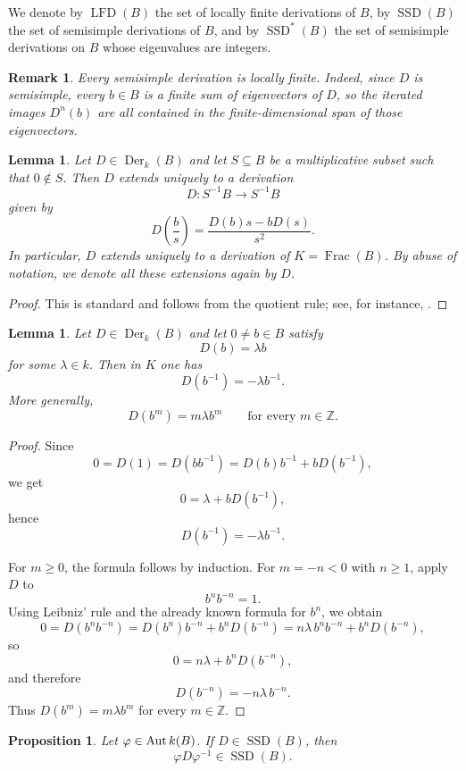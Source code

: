 \documentclass[12pt]{amsart}
\newtheorem{proposition}[theorem]{Proposition}
\newtheorem{lemma}[theorem]{Lemma}
\newtheorem{remark}[theorem]{Remark}
\newcommand{\Z}{\mathbb Z}
\newcommand{\Der}{\operatorname{Der}}
\newcommand{\Aut}[1]{\operatorname{Aut}}
\newcommand{\Frac}{\operatorname{Frac}}
\newcommand{\SSD}{\operatorname{SSD}}
\newcommand{\LFD}{\operatorname{LFD}}
\begin{document}
We denote by $\LFD(B)$ the set of locally finite derivations of $B$, by $\SSD(B)$ the set of semisimple derivations of $B$, and by $\SSD^{*}(B)$ the set of semisimple derivations on $B$ whose eigenvalues are integers.

\begin{remark}
Every semisimple derivation is locally finite. Indeed, since $D$ is semisimple, every $b\in B$ is a finite sum of eigenvectors of $D$, so the iterated images $D^n(b)$ are all contained in the finite-dimensional span of those eigenvectors.
\end{remark}

\begin{lemma}
Let $D\in \Der_k(B)$ and let $S\subseteq B$ be a multiplicative subset such that $0\notin S$. Then $D$ extends uniquely to a derivation
\[
D\colon S^{-1}B\to S^{-1}B
\]
given by
\[
D\!\left(\frac{b}{s}\right)=\frac{D(b)s-bD(s)}{s^2}.
\]
In particular, $D$ extends uniquely to a derivation of $K=\Frac(B)$. By abuse of notation, we denote all these extensions again by $D$.
\end{lemma}

\begin{proof}
This is standard and follows from the quotient rule; see, for instance, \cite[Chapter~1]{Fre06}.
\end{proof}

\begin{lemma}
Let $D\in \Der_k(B)$ and let $0\neq b\in B$ satisfy
\[
D(b)=\lambda b
\]
for some $\lambda\in k$. Then in $K$ one has
\[
D(b^{-1})=-\lambda b^{-1}.
\]
More generally,
\[
D(b^m)=m\lambda b^m \qquad \text{for every } m\in \Z.
\]
\end{lemma}

\begin{proof}
Since
\[
0=D(1)=D(bb^{-1})=D(b)b^{-1}+bD(b^{-1}),
\]
we get
\[
0=\lambda+bD(b^{-1}),
\]
hence
\[
D(b^{-1})=-\lambda b^{-1}.
\]

For $m\ge 0$, the formula follows by induction. For $m=-n<0$ with $n\ge 1$, apply $D$ to
\[
b^n b^{-n}=1.
\]
Using Leibniz' rule and the already known formula for $b^n$, we obtain
\[
0=D(b^n b^{-n})=D(b^n)b^{-n}+b^nD(b^{-n})
=n\lambda\, b^n b^{-n}+b^nD(b^{-n}),
\]
so
\[
0=n\lambda+b^nD(b^{-n}),
\]
and therefore
\[
D(b^{-n})=-n\lambda\, b^{-n}.
\]
Thus $D(b^m)=m\lambda b^m$ for every $m\in\Z$.
\end{proof}

\begin{proposition}
Let $\varphi\in \Aut_k(B)$. If $D\in \SSD(B)$, then
\[
\varphi D\varphi^{-1}\in \SSD(B).
\]
\end{proposition}
\end{document}

